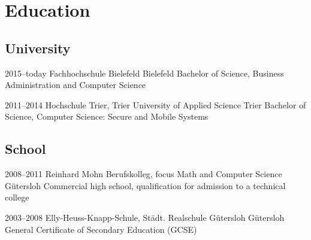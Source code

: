 \documentclass[]{friggeri-cv} %
\begin{document}

\section{Education}

\subsection{University}

\begin{entrylist}
	
	\entry
	{2015--today}
	{Fachhochschule Bielefeld}
	{Bielefeld}
	{Bachelor of Science, Business Administration and Computer Science}
	
	
	\entry
	{2011--2014}
	{Hochschule Trier, Trier University of Applied Science}
	{Trier}
	{Bachelor of Science, Computer Science: Secure and Mobile Systems}
	
	
\end{entrylist}

\subsection{School}

\begin{entrylist}
	
	\entry
	{2008--2011}
	{Reinhard Mohn Berufskolleg, focus Math and Computer Science}
	{G\"{u}tersloh}
	{Commercial high school, qualification for admission to a technical college}
	
	
	\entry
	{2003--2008}
	{Elly-Heuss-Knapp-Schule, St\"{a}dt. Realschule G\"{u}tersloh}
	{G\"{u}tersloh}
	{General Certificate of Secondary Education (GCSE)}
	
	
\end{entrylist}


\pagebreak

\end{document}
